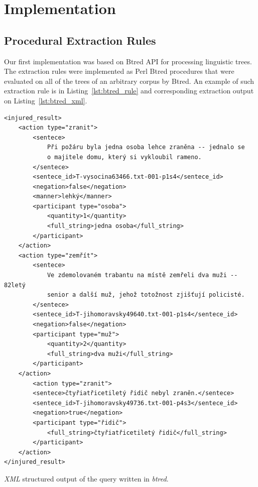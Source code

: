 \section{Implementation}

\subsection{Procedural Extraction Rules} \label{sec:ch50_Procedural_Extraction_Rules}

Our first implementation was based on Btred API for processing linguistic trees. The extraction rules were implemented as Perl Btred procedures that were evaluated on all of the trees of an arbitrary corpus by Btred. An example of such extraction rule is in Listing~\ref{lst:btred_rule} and corresponding extraction output on Listing~\ref{lst:btred_xml}.


\begin{listing}[ht]
\begin{verbatim}
<injured_result>
	<action type="zranit">
		<sentece>
			Při požáru byla jedna osoba lehce zraněna -- jednalo se
			o majitele domu, který si vykloubil rameno.
		</sentece>
		<sentece_id>T-vysocina63466.txt-001-p1s4</sentece_id>
		<negation>false</negation>
		<manner>lehký</manner>
		<participant type="osoba">
			<quantity>1</quantity>
			<full_string>jedna osoba</full_string>
		</participant>
	</action>
	<action type="zemřít">
		<sentece>
			Ve zdemolovaném trabantu na místě zemřeli dva muži -- 82letý
			senior a další muž, jehož totožnost zjišťují policisté.
		</sentece>
		<sentece_id>T-jihomoravsky49640.txt-001-p1s4</sentece_id>
		<negation>false</negation>
		<participant type="muž">
			<quantity>2</quantity>
			<full_string>dva muži</full_string>
		</participant>
	</action>
		<action type="zranit">
		<sentece>čtyřiatřicetiletý řidič nebyl zraněn.</sentece>
		<sentece_id>T-jihomoravsky49736.txt-001-p4s3</sentece_id>
		<negation>true</negation>
		<participant type="řidič">
			<full_string>čtyřiatřicetiletý řidič</full_string>
		</participant>
	</action>
</injured_result>
\end{verbatim}
\caption{\emph{XML} structured output of the query written in \emph{btred}.}
\label{lst:btred_xml}
\end{listing}




